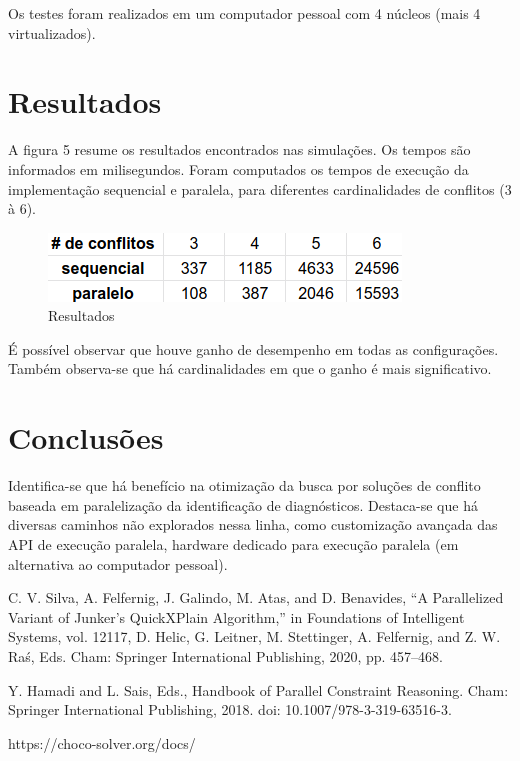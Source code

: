 \documentclass[conference]{IEEEtran}
\begin{document}
Os testes foram realizados em um computador pessoal com 4 núcleos (mais 4 virtualizados).

\section{Resultados}

A figura 5 resume os resultados encontrados nas simulações. Os tempos são informados em milisegundos. Foram computados os tempos de execução da implementação sequencial e paralela, para diferentes cardinalidades de conflitos (3 à 6).

\begin{figure}[htbp]
\centerline{\includegraphics[width=0.7\columnwidth]{result_table.png}}
\caption{Resultados} 
\label{fig}
\end{figure}

É possível observar que houve ganho de desempenho em todas as configurações. Também observa-se que há cardinalidades em que o ganho é mais significativo.

\section{Conclusões}

Identifica-se que há benefício na otimização da busca por soluções de conflito baseada em paralelização da identificação de diagnósticos. Destaca-se que há diversas caminhos não explorados nessa linha, como customização avançada das API de execução paralela, hardware dedicado para execução paralela (em alternativa ao computador pessoal).

\begin{thebibliography}{00}
 C. V. Silva, A. Felfernig, J. Galindo, M. Atas, and D. Benavides, “A Parallelized Variant of Junker’s QuickXPlain Algorithm,” in Foundations of Intelligent Systems, vol. 12117, D. Helic, G. Leitner, M. Stettinger, A. Felfernig, and Z. W. Raś, Eds. Cham: Springer International Publishing, 2020, pp. 457–468.

 Y. Hamadi and L. Sais, Eds., Handbook of Parallel Constraint Reasoning. Cham: Springer International Publishing, 2018. doi: 10.1007/978-3-319-63516-3.

 https://choco-solver.org/docs/
\end{thebibliography}
\vspace{12pt}
\end{document}
